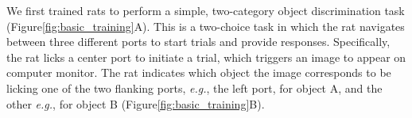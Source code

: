We first trained rats to perform a simple, two-category object discrimination task\cite{Zoccolan2009} (Figure\ref{fig:basic_training}A). This is a two-choice task in which the rat navigates between three different ports to start trials and provide responses. Specifically, the rat licks a center port to initiate a trial, which triggers an image to appear on computer monitor. The rat indicates which object the image corresponds to be licking one of the two flanking ports, \textit{e.g.}, the left port, for object A, and the other \textit{e.g.}, for object B (Figure\ref{fig:basic_training}B).

